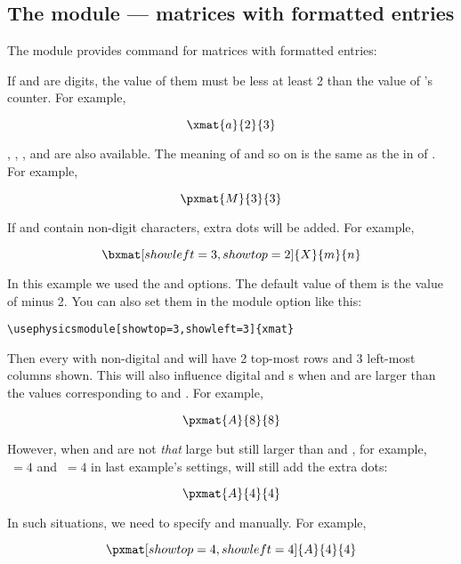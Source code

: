 \documentclass[11pt,letterpaper]{article}
\begin{document}
\subsection{The  module --- matrices with formatted entries}
The  module provides  command for matrices with formatted
entries:
\begin{center}
\end{center}
If  and  are digits, the value of them
must be less at least 2 than the value of 's 
counter. For example,
\begin{example}
\[
  \xmat{a}{2}{3}
\]
\end{example}
, , ,  and  are also
available. The meaning of  and so on is the same as the 
in  of . For example,
\begin{example}
\[
  \pxmat{M}{3}{3}
\]
\end{example}
If  and  contain non-digit characters,
extra dots will be added. For example,
\begin{example}
\[
  \bxmat[showleft=3,showtop=2]
    {X}{m}{n}
\]
\end{example}
In this example we used the  and  options. The
default value of them is the value of  minus 2. You can
also set them in the module option like this:
\begin{Verbatim}
\usephysicsmodule[showtop=3,showleft=3]{xmat}
\end{Verbatim}
Then every  with non-digital  and 
will have 2 top-most rows and 3 left-most columns shown. This will also
influence digital  and  s when
 and  are larger than the values
corresponding to  and . For example,
\begin{example}
\[ \pxmat{A}{8}{8} \]
\end{example}
However, when  and  are not \emph{that} large
but still larger than  and , for example,
$\:=4$ and $\:=4$ in last example's settings,
 will still add the extra dots:
\begin{example}
\[ \pxmat{A}{4}{4} \]
\end{example}
In such situations, we need to specify  and 
manually. For example,
\begin{example}
\[ \pxmat[showtop=4,showleft=4]
     {A}{4}{4}               \]
\end{example}
\end{document}
